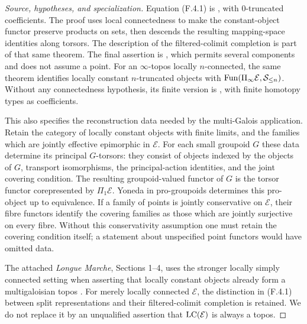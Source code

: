 \begin{proof}[Source, hypotheses, and specialization]
Equation (F.4.1) is
\citet[Theorem 3.13, case $n=0$]{EF_Hoyois2018}, with
0-truncated coefficients.  The proof uses local connectedness to
make the constant-object functor preserve products on sets, then
descends the resulting mapping-space identities along torsors.
The description of the filtered-colimit completion is part of that
same theorem.  The final assertion is
\citet[Corollary 3.20, case $n=1$]{EF_Hoyois2018}, which permits
several components and does not assume a point.  For an
$\infty$-topos locally $n$-connected, the same theorem identifies
locally constant $n$-truncated objects with
$\operatorname{Fun}(\Pi_\infty\mathcal E,\mathcal S_{\le n})$.
Without any connectedness hypothesis, its finite version is
\citet[Theorem 4.3]{EF_Hoyois2018}, with finite homotopy types as
coefficients.

This also specifies the reconstruction data needed by the
multi-Galois application.  Retain the category of locally constant
objects with finite limits, and the families which are jointly
effective epimorphic in $\mathcal E$.  For each small groupoid $G$
these data determine its principal $G$-torsors: they consist of
objects indexed by the objects of $G$, transport isomorphisms, the
principal-action identities, and the joint covering condition.
The resulting groupoid-valued functor of $G$ is the torsor functor
corepresented by $\Pi_1\mathcal E$.  Yoneda in pro-groupoids
determines this pro-object up to equivalence.  If a family of points
is jointly conservative on $\mathcal E$, their
fibre functors identify the covering families as those which are
jointly surjective on every fibre.  Without this conservativity
assumption one must retain the covering condition itself; a
statement about unspecified point functors would have omitted data.

The attached \emph{Longue Marche}, Sections 1--4, uses the stronger
locally simply connected setting when asserting that locally
constant objects already form a multigaloisian topos
\citep[Section 2, Theorem 2.1 and Definition 2.2]{EF_LongueMarche}.
For merely locally connected $\mathcal E$, the distinction in
(F.4.1) between split representations and their filtered-colimit
completion is retained.  We do not replace it by an unqualified
assertion that $\operatorname{LC}(\mathcal E)$ is always a topos.
\end{proof}

